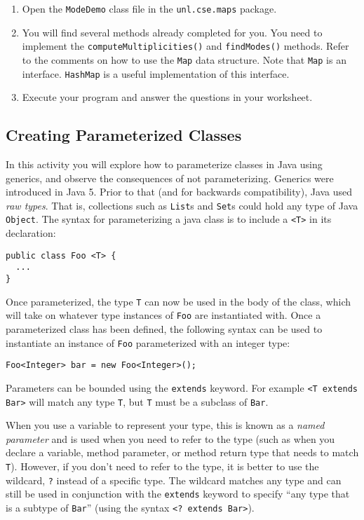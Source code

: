 \documentclass[12pt]{scrartcl}
\begin{document}
\begin{enumerate}
  \item Open the \texttt{ModeDemo} class file in the 
	\texttt{unl.cse.maps} package.
  \item You will find several methods already completed for you.  
	You need to implement the \texttt{computeMultiplicities()} 
	and \texttt{findModes()} methods.  Refer to the comments 
	on how to use the \texttt{Map} data structure.  Note 
	that \texttt{Map} is an interface.  \texttt{HashMap} 
	is a useful implementation of this interface.
  \item Execute your program and answer the questions in your worksheet.
\end{enumerate}

\subsection*{Creating Parameterized Classes}

In this activity you will explore how to parameterize classes in 
Java using generics, and observe the consequences of not parameterizing.  
Generics were introduced in Java 5.  Prior to that (and for backwards 
compatibility), Java used \emph{raw types}.  That is, collections 
such as \texttt{List}s and \texttt{Set}s could 
hold any type of Java \texttt{Object}.  The syntax for 
parameterizing a java class is to include a \texttt{<T>} 
in its declaration:

\begin{verbatim}
public class Foo <T> {
  ...
}
\end{verbatim}

Once parameterized, the type \texttt{T} can now be used 
in the body of the class, which will take on whatever type instances 
of \texttt{Foo} are instantiated with.  Once a parameterized 
class has been defined, the following syntax can be used to instantiate 
an instance of \texttt{Foo} parameterized with an integer type:

\texttt{Foo<Integer> bar = new Foo<Integer>();}

Parameters can be bounded using the \texttt{extends} keyword.  
For example \texttt{<T extends Bar>} will match any type 
\texttt{T}, but \texttt{T} must be a subclass of 
\texttt{Bar}.

When you use a variable to represent your type, this is known as a 
\emph{named parameter} and is used when you need to refer to the type 
(such as when you declare a variable, method parameter, or method 
return type that needs to match \texttt{T}).  However, if 
you don't need to refer to the type, it is better to use the wildcard, 
\texttt{?} instead of a specific type.  The wildcard 
matches any type and can still be used in conjunction with the 
\texttt{extends} keyword to specify ``any type that is a 
subtype of \texttt{Bar}'' (using the syntax 
\texttt{<? extends Bar>}).
\end{document}
